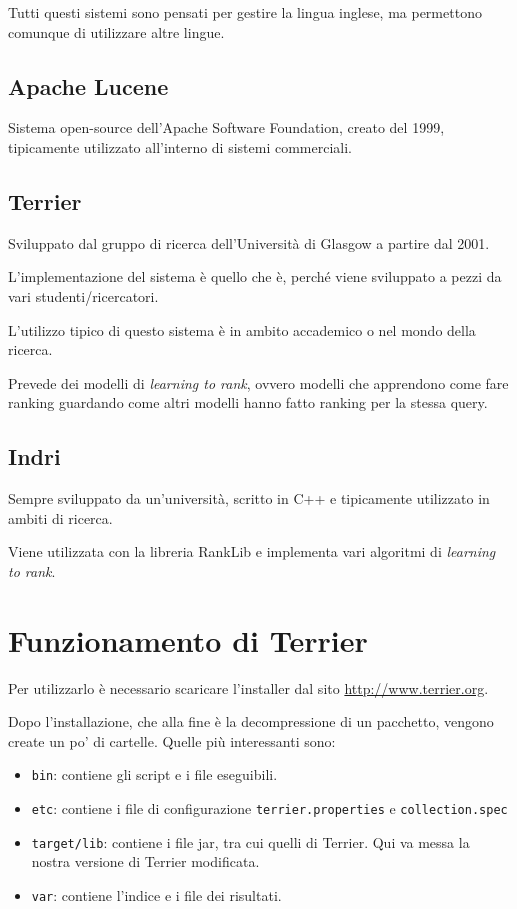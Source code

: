 \noindent Tutti questi sistemi sono pensati per gestire la lingua inglese, ma permettono comunque di utilizzare altre lingue.


\subsection{Apache Lucene}

Sistema open-source dell'Apache Software Foundation, creato del 1999, tipicamente utilizzato all'interno di sistemi commerciali.

\subsection{Terrier}

Sviluppato dal gruppo di ricerca dell'Università di Glasgow a partire dal 2001.

L'implementazione del sistema è quello che è, perché viene sviluppato a pezzi da vari studenti/ricercatori.

L'utilizzo tipico di questo sistema è in ambito accademico o nel mondo della ricerca.

Prevede dei modelli di \textit{learning to rank}, ovvero modelli che apprendono come fare ranking guardando come altri modelli hanno fatto ranking per la stessa query. 

\subsection{Indri}

Sempre sviluppato da un'università, scritto in C++ e tipicamente utilizzato in ambiti di ricerca.

Viene utilizzata con la libreria RankLib e  implementa vari algoritmi di \textit{learning to rank}.

\section{Funzionamento di Terrier}

Per utilizzarlo è necessario scaricare l'installer dal sito \url{http://www.terrier.org}.

Dopo l'installazione, che alla fine è la decompressione di un pacchetto, vengono create un po' di cartelle. Quelle più interessanti sono:

\begin{itemize}
	\item \texttt{bin}: contiene gli script e i file eseguibili.
	\item \texttt{etc}: contiene i file di configurazione \texttt{terrier.properties} e \texttt{collection.spec}
	\item \texttt{target/lib}: contiene i file jar, tra cui quelli di Terrier. Qui va messa la nostra versione di Terrier modificata.
	\item \texttt{var}: contiene l'indice e i file dei risultati.
\end{itemize}


